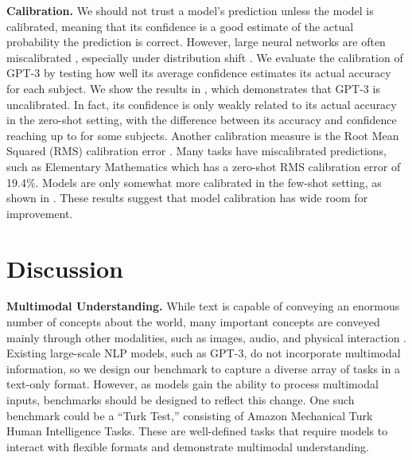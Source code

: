 \documentclass{article} \usepackage{iclr2021_conference, times}
\begin{document}
\noindent\textbf{Calibration.}\quad
We should not trust a model's prediction unless the model is calibrated, meaning that its confidence is a good estimate of the actual probability the prediction is correct. However, large neural networks are often miscalibrated \citep{kilian2017calibration}, especially under distribution shift \citep{ovadia2019can}. 
We evaluate the calibration of GPT-3 by testing how well its average confidence estimates its actual accuracy for each subject.
We show the results in , which demonstrates that GPT-3 is uncalibrated. In fact, its confidence is only weakly related to its actual accuracy in the zero-shot setting, with the difference between its accuracy and confidence reaching up to  for some subjects.
Another calibration measure is the Root Mean Squared (RMS) calibration error \citep{hendrycks2019oe,kumar2019verifiedcalibration}. Many tasks have miscalibrated predictions, such as Elementary Mathematics which has a zero-shot RMS calibration error of 19.4\%. Models are only somewhat more calibrated in the few-shot setting, as shown in .
These results suggest that model calibration has wide room for improvement.






































 \section{Discussion}
\noindent\textbf{Multimodal Understanding.}\quad
While text is capable of conveying an enormous number of concepts about the world, many important concepts are conveyed mainly through other modalities, such as images, audio, and physical interaction \citep{bisk2020experiencegroundslang}. Existing large-scale NLP models, such as GPT-3, do not incorporate multimodal information, so we design our benchmark to capture a diverse array of tasks in a text-only format. However, as models gain the ability to process multimodal inputs, benchmarks should be designed to reflect this change. One such benchmark could be a ``Turk Test,'' consisting of Amazon Mechanical Turk Human Intelligence Tasks. These are well-defined tasks that require models to interact with flexible formats and demonstrate multimodal understanding.
\end{document}
